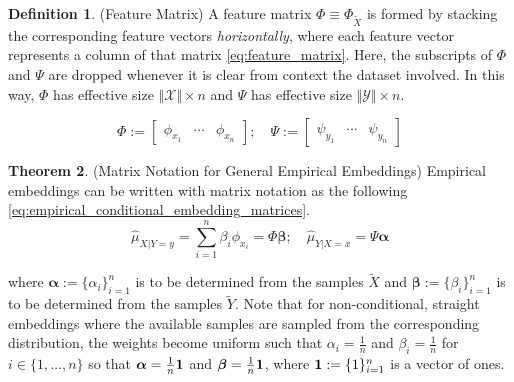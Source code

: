 \documentclass[twoside]{article} \usepackage{aistats2017}
\theoremstyle{definition}
\newtheorem{theorem}{Theorem}[section]
\newtheorem{definition}[theorem]{Definition}
\newcommand{\rv}[1]{{#1}}
\newcommand{\ds}[1]{\tilde{#1}}
\newcommand{\hatmuYx}{\hat{\mu}_{\rv{Y} | \rv{X} = x}}
\newcommand{\hatmuXy}{\hat{\mu}_{\rv{X} | \rv{Y} = y}}
\newcommand{\cardX}{\Vert \mathcal{X} \Vert}
\newcommand{\cardY}{\Vert \mathcal{Y} \Vert}
\begin{document}
%			
%			
%			
			\begin{definition} \label{def:feature_matrix}
				(Feature Matrix)
				A feature matrix $\Phi \equiv \Phi_{\ds{X}}$ is formed by stacking the corresponding feature vectors \textit{horizontally}, where each feature vector represents a column of that matrix \eqref{eq:feature_matrix}. Here, the subscripts of $\Phi$ and $\Psi$ are dropped whenever it is clear from context the dataset involved. In this way, $\Phi$ has effective size $\cardX \times n$ and $\Psi$ has effective size $\cardY \times n$.	
				
				\begin{equation}
					\Phi := \begin{bmatrix} \phi_{x_{1}} & \cdots & \phi_{x_{n}} \end{bmatrix}; \quad
					\Psi := \begin{bmatrix} \psi_{y_{1}} & \cdots & \psi_{y_{n}} \end{bmatrix}
				\label{eq:feature_matrix}
				\end{equation}
				
		
			\end{definition} 

			\begin{theorem} \label{thm:empirical_embedding_matrices}
				(Matrix Notation for General Empirical Embeddings)
				Empirical embeddings can be written with matrix notation as the following \eqref{eq:empirical_conditional_embedding_matrices}.
				\begin{equation}
					\hatmuXy = \sum_{i = 1}^{n} \beta_{i} \phi_{x_{i}} = \Phi \bm{\beta} ;\quad \hatmuYx = \Psi \bm{\alpha}
				\label{eq:empirical_conditional_embedding_matrices}
				\end{equation}
				
				where $\bm{\alpha} := \{\alpha_{i}\}_{i = 1}^{n}$ is to be determined from the samples $\ds{X}$ and $\bm{\beta} := \{\beta_{i}\}_{i = 1}^{n}$ is to be determined from the samples $\ds{Y}$. Note that for non-conditional, straight embeddings where the available samples are sampled from the corresponding distribution, the weights become uniform such that $\alpha_{i} = \frac{1}{n}$ and $\beta_{i} = \frac{1}{n}$ for $i \in \{1, \dots, n\}$ so that $\bm{\alpha} = \frac{1}{n} \mathbf{1}$ and $\bm{\beta} = \frac{1}{n} \mathbf{1}$, where $\mathbf{1} := \{1\}_{i = 1}^{n}$ is a vector of ones.
			\end{theorem}
			
\end{document}
